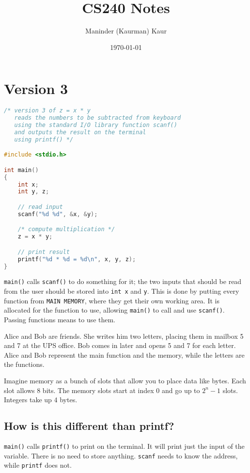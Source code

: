 \documentclass{article}
\title{CS240 Notes}
\author{Maninder (Kaurman) Kaur}
\date{\today}
\begin{document}
\maketitle

\section*{Version 3}
\begin{lstlisting}[language=C]
/* version 3 of z = x * y
   reads the numbers to be subtracted from keyboard
   using the standard I/O library function scanf()
   and outputs the result on the terminal
   using printf() */

#include <stdio.h>

int main()
{
    int x;
    int y, z;

    // read input
    scanf("%d %d", &x, &y);

    /* compute multiplication */
    z = x * y;

    // print result
    printf("%d * %d = %d\n", x, y, z);
}
\end{lstlisting}

\texttt{main()} calls \texttt{scanf()} to do something for it; the two inputs that should be read from the user should be stored into \texttt{int x} and \texttt{y}. This is done by putting every function from \texttt{MAIN MEMORY}, where they get their own working area. It is allocated for the function to use, allowing \texttt{main()} to call and use \texttt{scanf()}. Passing functions means to use them.

Alice and Bob are friends. She writes him two letters, placing them in mailbox 5 and 7 at the UPS office. Bob comes in later and opens 5 and 7 for each letter. Alice and Bob represent the main function and the memory, while the letters are the functions.

Imagine memory as a bunch of slots that allow you to place data like bytes. Each slot allows 8 bits. The memory slots start at index 0 and go up to \( 2^{n}-1\) slots. Integers take up 4 bytes.

\subsection*{How is this different than printf?}
\texttt{main()} calls \texttt{printf()} to print on the terminal. It will print just the input of the variable. There is no need to store anything. \texttt{scanf} needs to know the address, while \texttt{printf} does not.
\end{document}
